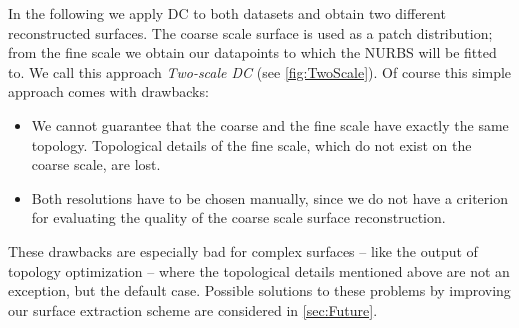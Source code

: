 In the following we apply \ac{DC} to both datasets and obtain two different reconstructed surfaces.
The coarse scale surface is used as a patch distribution; from the fine scale we obtain our datapoints to which the \ac{NURBS} will be fitted to. We call this approach \emph{Two-scale \acl{DC}} (see \autoref{fig:TwoScale}).
Of course this simple approach comes with drawbacks:
\begin{itemize}
\item We cannot guarantee that the coarse and the fine scale have exactly the same topology. Topological details of the fine scale, which do not exist on the coarse scale, are lost.
\item Both resolutions have to be chosen manually, since we do not have a criterion for evaluating the quality of the coarse scale surface reconstruction.
\end{itemize}
These drawbacks are especially bad for complex surfaces -- like the output of topology optimization -- where the topological details mentioned above are not an exception, but the default case. Possible solutions to these problems by improving our surface extraction scheme are considered in \autoref{sec:Future}.
